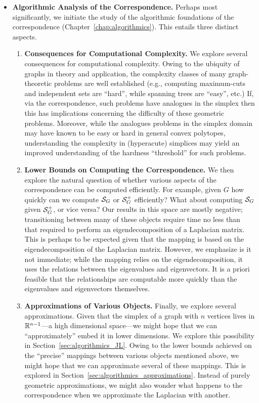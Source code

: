 \begin{itemize}
	\item {\bf Algorithmic Analysis of the Correspondence.} Perhaps most significantly, we initiate the study of the algorithmic foundations of the correspondence (Chapter~\ref{chap:algorithmics}). This entails three distinct aspects. 
	\begin{enumerate}
		\item {\bf Consequences for Computational Complexity.}	We explore several consequences for computational  complexity.  Owing to the ubiquity of graphs in theory and application, the complexity classes of many graph-theoretic problems are  well established (e.g., computing maximum-cuts and independent sets are ``hard'', while spanning trees are ``easy'', etc.) If, via the correspondence, such problems have analogues in the simplex then this has implications concerning the difficulty of these geometric problems. Moreover, while the analogues problems in the simplex domain may have known to be easy or hard  in general convex polytopes, understanding the complexity in (hyperacute) simplices may yield an improved understanding of the hardness ``threshold'' for such problems. 
		\item {\bf Lower Bounds on Computing the Correspondence.} We then explore the natural question of whether various aspects of the correspondence can be computed efficiently. For example, given $G$ how quickly can we compute $\mathcal{S}_G$ or $\mathcal{S}_G^+$ efficiently? What about computing $\mathcal{S}_G$ given $\mathcal{S}_G^+$, or vice  versa? Our results in this  space are mostly negative; transitioning between many of these objects require time no less than that required to perform an eigendecomposition of a Laplacian matrix. 
		This is perhaps to be expected given that the mapping is based on the eigendecomposition of the Laplacian matrix. 
		However, we emphasize is it not immediate; while the mapping relies on the eigendecomposition, it uses the relations between the eigenvalues and eigenvectors. It is a priori  feasible that the relationships are computable  more quickly than the eigenvalues and eigenvectors  themselves. 
		\item {\bf Approximations of Various Objects.} Finally, we explore several approximations. Given that  the simplex of a graph with $n$ vertices lives in $\mathbb{R}^{n-1}$---a high dimensional  space---we might hope that we can ``approximately'' embed it  in  lower dimensions. We explore this possibility in Section~\ref{sec:algorithmics_JL}. Owing to the lower bounds achieved on the ``precise'' mappings between various objects mentioned above, we might hope that we can approximate several of these mappings. This is explored in Section~\ref{sec:algorithmics_approximations}. 
		Instead of purely geometric approximations, we might also wonder what happens to the correspondence when we approximate the Laplacian with another. 
	\end{enumerate}

\end{itemize}

